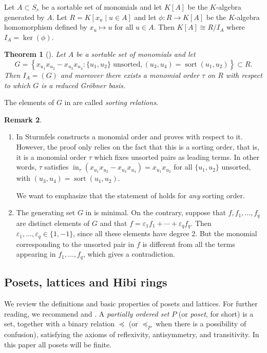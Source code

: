 \documentclass[12pt]{amsart}
\numberwithin{equation}{section}
\newtheorem{theorem}{Theorem}[section]
\theoremstyle{definition}
\newtheorem{remark}[theorem]{Remark}
\DeclareMathOperator{\ini}{in}
\def\sort{\operatorname{sort}}
\begin{document}
Let $A\subset S_s$ be a sortable set of monomials and let $K[A]$ be the $K$-algebra
generated by $A$.  Let $R=K[x_u\mid u\in A]$ and let $\phi : R \to K[A]$ be
the $K$-algebra homomorphism defined by $x_u\mapsto u$ for all $u\in A$. Then $K[A] \cong R/I_A$ where $I_A = \ker(\phi)$.
\begin{theorem}
[{\cite[Theorem 14.2]{St}}]
\label{thm:sortingGB}
Let $A$ be a sortable set of monomials and let
$$G = \left\{x_{u_1}x_{u_2}-x_{u_3}x_{u_4}: \{u_1, u_2\} \text{ unsorted}, (u_3, u_4) = \sort(u_1, u_2)\right\} \subset R.$$
Then $I_A=(G)$ and moreover there exists a monomial order $\tau$ on $R$ with respect to which $G$ is a reduced Gröbner basis. 
\end{theorem}
The elements of $G$ in  are called \emph{sorting relations}.
\begin{remark}
\label{rem: minimal sort}
\begin{enumerate}
    \item 
In \cite{St} Sturmfels constructs a monomial order and proves {\cite[Theorem 14.2]{St}} with respect to it. However, the proof only relies on the fact that this is a sorting order, that is, it is a monomial order $\tau$ which fixes unsorted pairs as leading terms. In other words, $\tau$ satisfies $\ini_{\tau}(x_{u_1}x_{u_2}-x_{u_3}x_{u_4})=x_{u_1}x_{u_2}$ for all $\{u_1, u_2\}$ unsorted, with $(u_3, u_4) = \sort(u_1, u_2)$. 

\noindent We want to emphasize that the statement of \cite[Theorem 14.2]{St} holds for \emph{any} sorting order.
     
\item The generating set $G$ in  is minimal. On the contrary, suppose that $f,f_1,\ldots,f_q$ are distinct elements of $G$ and that $f=\varepsilon_1f_1+\cdots +\varepsilon_qf_q$. Then $\varepsilon_1,\ldots, \varepsilon_q\in \{1,-1\}$, since all these elements have  degree $2$. 
But the monomial corresponding to the unsorted pair in $f$ is different from all the terms appearing in $f_1,\ldots, f_q$, which gives a contradiction. 

\end{enumerate}
\end{remark}


\subsection{Posets, lattices and Hibi rings} We review the definitions and basic properties of posets and lattices. For further reading, we recommend \cite{B} and \cite{Stn}. 
A \emph{partially ordered set} $P$ (or \emph{poset}, for short) is a set, together with a binary relation $\preceq$ (or $\preceq_P$ when there is a possibility of confusion), 
satisfying the axioms of reflexivity, antisymmetry, and transitivity. In this paper all posets will be finite.
 
\end{document}
